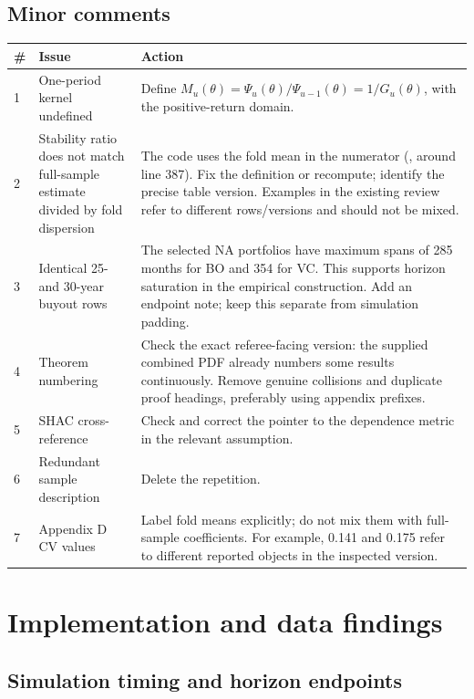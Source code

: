 \documentclass[11pt]{article}
\newcommand{\code}[1]{\texttt{\detokenize{#1}}}
\theoremstyle{plain}
\theoremstyle{definition}
\begin{document}
\subsection{Minor comments}
{\small
\begin{longtable}{@{}L{0.7cm}L{4.6cm}L{10.0cm}@{}}
\toprule
\# & Issue & Action\\
\midrule
{} & One-period kernel undefined & Define $M_u(\theta)=\Psi_u(\theta)/\Psi_{u-1}(\theta)=1/G_u(\theta)$, with the positive-return domain.\\
2 & Stability ratio does not match full-sample estimate divided by fold dispersion & The code uses the fold mean in the numerator (\code{results/analyze_result.R}, around line 387). Fix the definition or recompute; identify the precise table version. Examples in the existing review refer to different rows/versions and should not be mixed.\\
3 & Identical 25- and 30-year buyout rows & The selected NA portfolios have maximum spans of 285 months for BO and 354 for VC. This supports horizon saturation in the empirical construction. Add an endpoint note; keep this separate from simulation padding.\\
4 & Theorem numbering & Check the exact referee-facing version: the supplied combined PDF already numbers some results continuously. Remove genuine collisions and duplicate proof headings, preferably using appendix prefixes.\\
5 & SHAC cross-reference & Check and correct the pointer to the dependence metric in the relevant assumption.\\
6 & Redundant sample description & Delete the repetition.\\
7 & Appendix D CV values & Label fold means explicitly; do not mix them with full-sample coefficients. For example, 0.141 and 0.175 refer to different reported objects in the inspected version.\\
\bottomrule
\end{longtable}
}

\section{Implementation and data findings}

\subsection{Simulation timing and horizon endpoints}
\label{sec:implementation}
\end{document}
